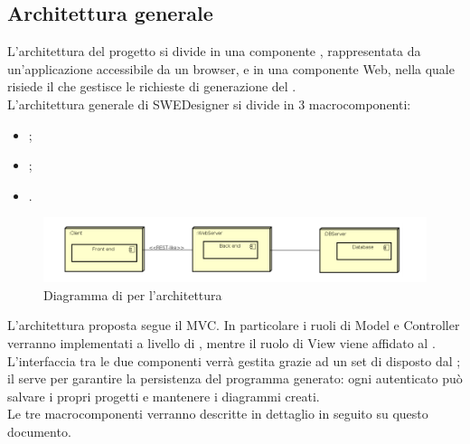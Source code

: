 	\subsection{Architettura generale}
	\label{3.2}
	L'architettura del progetto si divide in una componente , rappresentata da un'applicazione
 accessibile da un browser, e in una componente Web, nella quale risiede il  che gestisce le richieste di generazione del .\\
L'architettura generale di SWEDesigner si divide in 3 macrocomponenti:
\begin{itemize}
\item \textbf{};
\item \textbf{ };
\item \textbf{}.
\end{itemize}

 \begin{figure}[h!]
\centering
\includegraphics[scale=0.4]{Disegnetti/architetturaGenerale.png}
\caption{Diagramma di  per l'architettura}
 \end{figure}

L'architettura proposta segue il  MVC. In particolare i ruoli di Model e Controller verranno implementati a livello di , mentre il ruolo di View viene affidato al . L'interfaccia tra le due componenti verrà gestita grazie ad un set di  disposto dal  ; il  serve per garantire la persistenza del programma generato: ogni  autenticato può salvare i propri progetti e mantenere i diagrammi creati.\\
Le tre macrocomponenti verranno descritte in dettaglio in seguito su questo documento.
